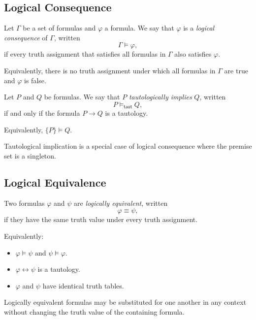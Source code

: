 \subsection{Logical Consequence}

\begin{definition}
Let $\Gamma$ be a set of formulas and $\varphi$ a formula.
We say that $\varphi$ is a \emph{logical consequence} of $\Gamma$, written
\[
\Gamma \models \varphi,
\]
if every truth assignment that satisfies all formulas in $\Gamma$ also satisfies
$\varphi$.

Equivalently, there is no truth assignment under which all formulas in $\Gamma$
are true and $\varphi$ is false.
\end{definition}

\begin{definition}
Let $P$ and $Q$ be formulas.
We say that $P$ \emph{tautologically implies} $Q$, written
\[
P \models_{\mathsf{taut}} Q,
\]
if and only if the formula $P \rightarrow Q$ is a tautology.

Equivalently, $\{P\} \models Q$.
\end{definition}

\begin{remark}
Tautological implication is a special case of logical consequence where the
premise set is a singleton.
\end{remark}

\subsection{Logical Equivalence}

\begin{definition}
Two formulas $\varphi$ and $\psi$ are \emph{logically equivalent}, written
\[
\varphi \equiv \psi,
\]
if they have the same truth value under every truth assignment.

Equivalently:
\begin{itemize}
  \item $\varphi \models \psi$ and $\psi \models \varphi$.
  \item $\varphi \leftrightarrow \psi$ is a tautology.
  \item $\varphi$ and $\psi$ have identical truth tables.
\end{itemize}
\end{definition}

\begin{remark}
Logically equivalent formulas may be substituted for one another in any context
without changing the truth value of the containing formula.
\end{remark}

